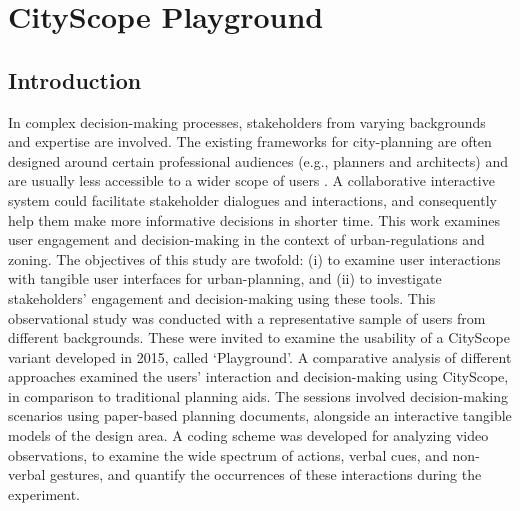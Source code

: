 \section{CityScope Playground}\label{sec:cityscope_playground}

{
    \subsection{Introduction}
    {
        In complex decision-making processes, stakeholders from varying backgrounds and expertise are involved. The existing frameworks for city-planning are often designed around certain professional audiences (e.g., planners and architects) and are usually less accessible to a wider scope of users \cite{ben-joseph2001}. A collaborative interactive system could facilitate stakeholder dialogues and interactions, and consequently help them make more informative decisions in shorter time.
        \newline
        This work examines user engagement and decision-making in the context of urban-regulations and zoning. The objectives of this study are twofold: (i) to examine user interactions with tangible user interfaces for urban-planning, and (ii) to investigate stakeholders' engagement and decision-making using these tools.
        This observational study was conducted with a representative sample of users from different backgrounds. These were invited to examine the usability of a CityScope variant developed in 2015, called `Playground'. A comparative analysis of different approaches examined the users' interaction and decision-making using CityScope, in comparison to traditional planning aids. The sessions involved decision-making scenarios using paper-based planning documents, alongside an interactive tangible models of the design area. A coding scheme was developed for analyzing video observations, to examine the wide spectrum of actions, verbal cues, and non-verbal gestures, and quantify the occurrences of these interactions during the experiment.
    }

}
